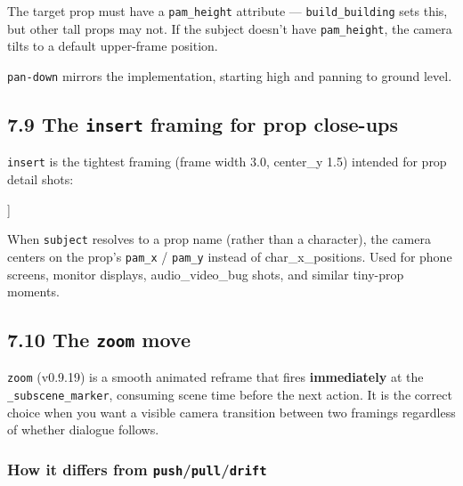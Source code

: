 \documentclass[
  11pt,
]{book}
\newenvironment{Shaded}{}{}
\newcommand{\NormalTok}[1]{#1}
\begin{document}
The target prop must have a \texttt{pam\_height} attribute ---
\texttt{build\_building} sets this, but other tall props may not. If the
subject doesn't have \texttt{pam\_height}, the camera tilts to a default
upper-frame position.

\texttt{pan-down} mirrors the implementation, starting high and panning
to ground level.

\subsection{\texorpdfstring{7.9 The \texttt{insert} framing for prop
close-ups}{7.9 The insert framing for prop close-ups}}\label{the-insert-framing-for-prop-close-ups}

\texttt{insert} is the tightest framing (frame width 3.0, center\_y 1.5)
intended for prop detail shots:

\begin{Shaded}
\begin{Highlighting}[]
\NormalTok{[[ CAMERA: FRAMING=insert | SUBJECT=smartphone | MOVE=null | TRANSITION=cut ]]}
\end{Highlighting}
\end{Shaded}

When \texttt{subject} resolves to a prop name (rather than a character),
the camera centers on the prop's \texttt{pam\_x} / \texttt{pam\_y}
instead of char\_x\_positions. Used for phone screens, monitor displays,
audio\_video\_bug shots, and similar tiny-prop moments.

\subsection{\texorpdfstring{7.10 The \texttt{zoom}
move}{7.10 The zoom move}}\label{the-zoom-move}

\texttt{zoom} (v0.9.19) is a smooth animated reframe that fires
\textbf{immediately} at the \texttt{\_subscene\_marker}, consuming scene
time before the next action. It is the correct choice when you want a
visible camera transition between two framings regardless of whether
dialogue follows.

\subsubsection{How it differs from \texttt{push}/\texttt{pull}/\texttt{drift}}\label{zoom-vs-deferred}
\end{document}
